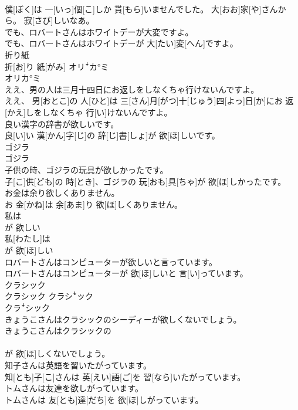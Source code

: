 \documentclass[8pt]{extreport}
\begin{document}
\begin{CJK}{UTF8}{min}
\\	僕[ぼく]は 一[いっ]個[こ]しか 貰[もら]いませんでした。 大[おお]家[や]さんから。 寂[さび]しいなあ。
\\	でも、ロバートさんはホワイトデーが大変ですよ。	
\\	でも、ロバートさんはホワイトデーが 大[たい]変[へん]ですよ。
\\	折り紙	
\\	折[お]り 紙[がみ]	オリꜜカ°ミ 
\\	オリカ°ミ
\\	ええ、男の人は三月十四日にお返しをしなくちゃ行けないんですよ。	
\\	ええ、 男[おとこ]の 人[ひと]は 三[さん]月[がつ]十[じゅう]四[よっ]日[か]にお 返[かえ]しをしなくちゃ 行[い]けないんですよ。
\\	良い漢字の辞書が欲しいです。	
\\	良[い]い 漢[かん]字[じ]の 辞[じ]書[しょ]が 欲[ほ]しいです。
\\	ゴジラ	
\\	ゴジラ	
\\	子供の時、ゴジラの玩具が欲しかったです。	
\\	子[こ]供[ども]の 時[とき]、ゴジラの 玩[おも]具[ちゃ]が 欲[ほ]しかったです。
\\	お金は余り欲しくありません。	
\\	お 金[かね]は 余[あま]り 欲[ほ]しくありません。
\\	私は 
\\	が 欲しい	
\\	私[わたし]は 
\\	が 欲[ほ]しい
\\	ロバートさんはコンピューターが欲しいと言っています。	
\\	ロバートさんはコンピューターが 欲[ほ]しいと 言[い]っています。
\\	クラシック	
\\	クラシック	クラシꜜック 
\\	クラꜜシック
\\	きょうこさんはクラシックのシーディーが欲しくないでしょう。	
\\	きょうこさんはクラシックの 
\\	[シー]
\\	[ディー]が 欲[ほ]しくないでしょう。
\\	知子さんは英語を習いたがっています。	
\\	知[とも]子[こ]さんは 英[えい]語[ご]を 習[なら]いたがっています。
\\	トムさんは友達を欲しがっています。	
\\	トムさんは 友[とも]達[だち]を 欲[ほ]しがっています。

\end{CJK}
\end{document}
